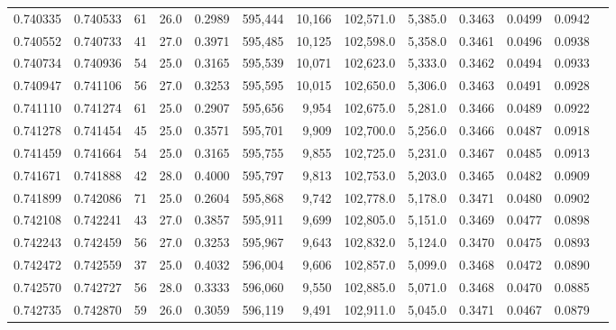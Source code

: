 \begin{tabular}{rrrrrrrrrrrrr}
0.740335 & 0.740533 &    61 & 26.0 &                                     0.2989 & 595,444 &  10,166 & 102,571.0 &   5,385.0 & 0.3463 & 0.0499 & 0.0942 \\
0.740552 & 0.740733 &    41 & 27.0 &                                     0.3971 & 595,485 &  10,125 & 102,598.0 &   5,358.0 & 0.3461 & 0.0496 & 0.0938 \\
0.740734 & 0.740936 &    54 & 25.0 &                                     0.3165 & 595,539 &  10,071 & 102,623.0 &   5,333.0 & 0.3462 & 0.0494 & 0.0933 \\
0.740947 & 0.741106 &    56 & 27.0 &                                     0.3253 & 595,595 &  10,015 & 102,650.0 &   5,306.0 & 0.3463 & 0.0491 & 0.0928 \\
0.741110 & 0.741274 &    61 & 25.0 &                                     0.2907 & 595,656 &   9,954 & 102,675.0 &   5,281.0 & 0.3466 & 0.0489 & 0.0922 \\
0.741278 & 0.741454 &    45 & 25.0 &                                     0.3571 & 595,701 &   9,909 & 102,700.0 &   5,256.0 & 0.3466 & 0.0487 & 0.0918 \\
0.741459 & 0.741664 &    54 & 25.0 &                                     0.3165 & 595,755 &   9,855 & 102,725.0 &   5,231.0 & 0.3467 & 0.0485 & 0.0913 \\
0.741671 & 0.741888 &    42 & 28.0 &                                     0.4000 & 595,797 &   9,813 & 102,753.0 &   5,203.0 & 0.3465 & 0.0482 & 0.0909 \\
0.741899 & 0.742086 &    71 & 25.0 &                                     0.2604 & 595,868 &   9,742 & 102,778.0 &   5,178.0 & 0.3471 & 0.0480 & 0.0902 \\
0.742108 & 0.742241 &    43 & 27.0 &                                     0.3857 & 595,911 &   9,699 & 102,805.0 &   5,151.0 & 0.3469 & 0.0477 & 0.0898 \\
0.742243 & 0.742459 &    56 & 27.0 &                                     0.3253 & 595,967 &   9,643 & 102,832.0 &   5,124.0 & 0.3470 & 0.0475 & 0.0893 \\
0.742472 & 0.742559 &    37 & 25.0 &                                     0.4032 & 596,004 &   9,606 & 102,857.0 &   5,099.0 & 0.3468 & 0.0472 & 0.0890 \\
0.742570 & 0.742727 &    56 & 28.0 &                                     0.3333 & 596,060 &   9,550 & 102,885.0 &   5,071.0 & 0.3468 & 0.0470 & 0.0885 \\
0.742735 & 0.742870 &    59 & 26.0 &                                     0.3059 & 596,119 &   9,491 & 102,911.0 &   5,045.0 & 0.3471 & 0.0467 & 0.0879 \\

\end{tabular}

